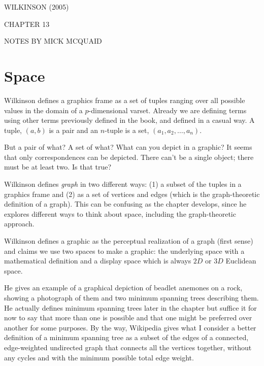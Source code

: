 
\begin{center}

  \textsf{\MakeUppercase{Wilkinson (2005)}}

\smallskip

\textsf{\MakeUppercase{Chapter 13}}

\smallskip

\textsf{\MakeUppercase{Notes by Mick McQuaid}}

\end{center}


\hypertarget{space}{%
\section{Space}\label{space}}

Wilkinson defines a graphics frame as a set of tuples ranging over all
possible values in the domain of a \(p\)-dimensional varset. Already we
are defining terms using other terms previously defined in the book, and
defined in a casual way. A tuple, \((a,b)\) is a pair and an \(n\)-tuple
is a set, \((a_1, a_2, \ldots, a_n)\).

But a pair of what? A set of what? What can you depict in a graphic? It
seems that only correspondences can be depicted. There can't be a single
object; there must be at least two. Is that true?

Wilkinson defines \emph{graph} in two different ways: (1) a subset of
the tuples in a graphics frame and (2) as a set of vertices and edges
(which is the graph-theoretic definition of a graph). This can be
confusing as the chapter develops, since he explores different ways to
think about space, including the graph-theoretic approach.

Wilkinson defines a graphic as the perceptual realization of a graph
(first sense) and claims we use two spaces to make a graphic: the
underlying space with a mathematical definition and a display space
which is always \(2D\) or \(3D\) Euclidean space.

He gives an example of a graphical depiction of beadlet anemones on a
rock, showing a photograph of them and two minimum spanning trees
describing them. He actually defines minimum spanning trees later in the
chapter but suffice it for now to say that more than one is possible and
that one might be preferred over another for some purposes. By the way,
Wikipedia gives what I consider a better definition of a minimum
spanning tree as a subset of the edges of a connected, edge-weighted
undirected graph that connects all the vertices together, without any
cycles and with the minimum possible total edge weight.

